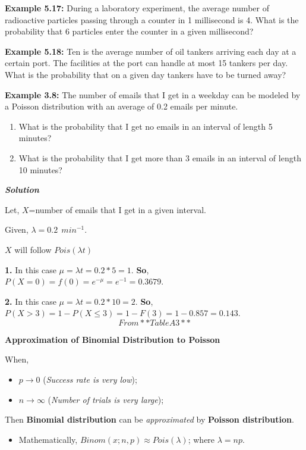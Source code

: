 \documentclass[
]{article}
\providecommand{\tightlist}{%
  \setlength{\itemsep}{0pt}\setlength{\parskip}{0pt}}
\begin{document}
\textbf{Example 5.17:}\citep{walpole_probability_2017} During a laboratory experiment, the average number of radioactive particles passing through a counter in 1 millisecond is 4. What is the probability that 6 particles enter the counter in a given millisecond?

\textbf{Example 5.18:}\citep{walpole_probability_2017} Ten is the average number of oil tankers arriving each day at a certain port. The facilities at the port can handle at most 15 tankers per day. What is the probability that on a given day tankers have to be turned away?

\textbf{Example 3.8:}\citep{pishro-nik_introduction_2014} The number of emails that I get in a weekday can be modeled by a Poisson distribution with an average of 0.2 emails per minute.

\begin{enumerate}
\def\labelenumi{\arabic{enumi}.}
\item
  What is the probability that I get no emails in an interval of length 5 minutes?
\item
  What is the probability that I get more than 3 emails in an interval of length 10 minutes?
\end{enumerate}

\textbf{\emph{Solution}}

Let, \(X\)=number of emails that I get in a given interval.

Given, \(\lambda =0.2 \ \ min^{-1}\).

\(X\) will follow \(Pois(\lambda t)\)

\textbf{1.} In this case \(\mu=\lambda t=0.2*5=1\). \textbf{So}, \(P(X=0)=f(0)=e^{-\mu}=e^{-1}=0.3679\).

\textbf{2.} In this case \(\mu=\lambda t=0.2*10=2\). \textbf{So},\(P(X>3)=1-P(X\le 3)=1-F(3)=1-0.857=0.143\). \[From **Table A3**\]

\textbf{Approximation of Binomial Distribution to Poisson}

When,

\begin{itemize}
\item
  \(p \rightarrow0\) (\emph{Success rate is very low});
\item
  \(n\rightarrow \infty\) (\emph{Number of trials is very large});
\end{itemize}

Then \textbf{Binomial distribution} can be \emph{approximated} by \textbf{Poisson distribution}.

\begin{itemize}
\tightlist
\item
  Mathematically, \(Binom (x; n,p)\approx Pois(\lambda)\); where \(\lambda=np\).
\end{itemize}
\end{document}
